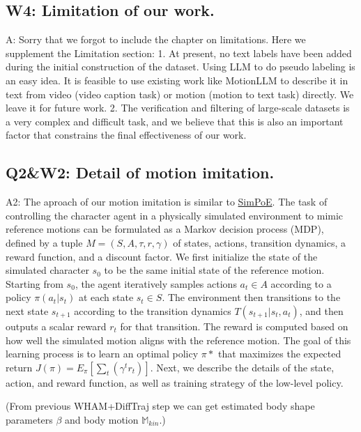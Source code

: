 \documentclass{article}
\begin{document}
\subsection{W4: Limitation of our work.}\label{w4-limitation-of-our-work.}

A: Sorry that we forgot to include the chapter on limitations. Here we supplement the Limitation section: 1. At present, no text labels have been added during the initial construction of the dataset. Using LLM to do pseudo labeling is an easy idea. It is feasible to use existing work like MotionLLM to describe it in text from video (video caption task) or motion (motion to text task) directly. We leave it for future work. 2. The verification and filtering of large-scale datasets is a very complex and difficult task, and we believe that this is also an important factor that constrains the final effectiveness of our work.

\subsection{Q2\&W2: Detail of motion imitation.}\label{q2w2-detail-of-motion-imitation.}

A2: The aproach of our motion imitation is similar to \href{https://arxiv.org/abs/2104.00683}{SimPoE}. The task of controlling the character agent in a physically simulated environment to mimic reference motions can be formulated as a Markov decision process (MDP), defined by a tuple $M=(S,A,\tau,r,\gamma)$ of states, actions, transition dynamics, a reward function, and a discount factor. We first initialize the state of the simulated character $s_0$ to be the same initial state of the reference motion. Starting from $s_0$, the agent iteratively samples actions $a_t \in A$ according to a policy $\pi(a_t | s_t)$ at each state $s_t \in S$. The environment then transitions to the next state $s_{t+1}$ according to the transition dynamics $T(s_{t+1} | s_t, a_t)$, and then outputs a scalar reward $r_t$ for that transition. The reward is computed based on how well the simulated motion aligns with the reference motion. The goal of this learning process is to learn an optimal policy $\pi*$ that maximizes the expected return $J(\pi) = E_\pi[\sum_t(\gamma^tr_t)]$. Next, we describe the details of the state, action, and reward function, as well as training strategy of the low-level policy.

(From previous WHAM+DiffTraj step we can get estimated body shape parameters $\beta$ and body motion $\mathbb{M}_{kin}$.)
\end{document}
